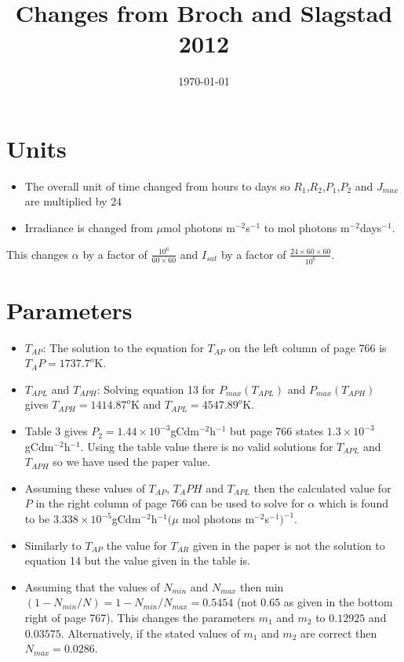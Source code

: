 \documentclass{article}
\title{Changes from Broch and Slagstad 2012}
\date{\today}
\author{}
\begin{document}
\maketitle
\section*{Units}
\begin{itemize}
    \item The overall unit of time changed from hours to days so $R_1$,$R_2$,$P_1$,$P_2$ and $J_{max}$ are multiplied by $24$
    \item Irradiance is changed from $\mu$mol photons m$^{-2}$s$^{-1}$ to mol photons m$^{-2}$days$^{-1}$.
\end{itemize}
This changes $\alpha$ by a factor of $\frac{10^6}{60\times60}$ and $I_{sat}$ by a factor of $\frac{24\times60\times60}{10^6}$.

\section*{Parameters}
\begin{itemize}
    \item $T_{AP}$: The solution to the equation for $T_{AP}$ on the left column of page 766 is $T_AP=1737.7^o$K.
    \item $T_{APL}$ and $T_{APH}$: Solving equation 13 for $P_{max}(T_{APL})$ and $P_{max}(T_{APH})$ gives $T_{APH}=1414.87^o$K and $T_{APL} = 4547.89^o$K.
    \item Table 3 gives $P_2=1.44\times10^{-3}$gCdm$^{-2}$h$^{-1}$ but page 766 states $1.3\times10^{-3}$gCdm$^{-2}$h$^{-1}$. Using the table value there is no valid solutions for $T_{APL}$ and $T_{APH}$ so we have used the paper value.
    \item Assuming these values of $T_{AP}$, $T_APH$ and $T_{APL}$ then the calculated value for $P$ in the right column of page 766 can be used to solve for $\alpha$ which is found to be $3.338\times10^{-5}$gCdm$^{-2}$h$^{-1}(\mu$ mol photons m$^{-2}$s$^{-1})^{-1}$.
    \item Similarly to $T_{AP}$ the value for $T_{AR}$ given in the paper is not the solution to equation 14 but the value given in the table is.
    \item Assuming that the values of $N_{min}$ and $N_{max}$ then min$(1-N_{min}/N)=1-N_{min}/N_{max}=0.5454$ (not $0.65$ as given in the bottom right of page 767). This changes the parameters $m_1$ and $m_2$ to $0.12925$ and $0.03575$. Alternatively, if the stated values of $m_1$ and $m_2$ are correct then $N_{max}=0.0286$.
\end{itemize}
\end{document}
